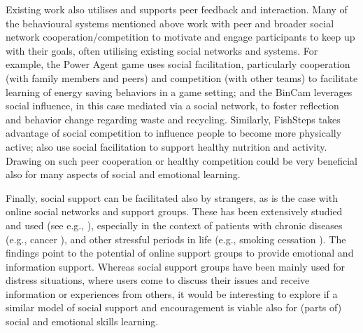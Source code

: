 \documentclass[prodmode,acmtochi]{acmsmall}
\newcommand{\todo}[1]{\textrm{\textrm{\textcolor{LightBlue}{[[#1]]}}}}
\begin{document}
Existing work also utilises and supports peer feedback and interaction. Many of the behavioural systems mentioned above work with peer and broader social network
cooperation/competition to motivate and engage participants to keep up with their goals, often utilising existing social networks and systems. For example, the Power Agent \cite{Gustafsson2009} game uses social facilitation, particularly cooperation (with family members and peers) and competition (with other teams) to facilitate learning of energy saving behaviors in a game setting; and the BinCam \cite{Thieme2012b} leverages social influence, in this case mediated via a social network, to foster reflection and behavior change regarding waste and recycling. %
%
Similarly, FishSteps \cite{Lin2006} takes advantage of social competition to
influence people to become more physically active;  also use social facilitation to support healthy nutrition and activity. 
Drawing on such peer cooperation or healthy competition could be very beneficial also for many aspects of social and emotional learning.  

Finally, social support can be facilitated also by strangers, as is the case with online social networks and support groups. These has been extensively studied and used (see e.g., \cite{Barak2008,Newman2011}), especially in the context of patients with chronic diseases (e.g., cancer \cite{Skeels2010}), and other stressful periods in life (e.g., smoking cessation \cite{Ploderer2013}). The findings point to the potential of online support groups to provide emotional and information support.  %
Whereas social support groups have been mainly used for distress situations, where users come to discuss their issues and receive information or experiences from others, it would be interesting to explore if a similar model of social support and encouragement is viable also for (parts of) social and emotional skills learning. %





                 
\end{document}
